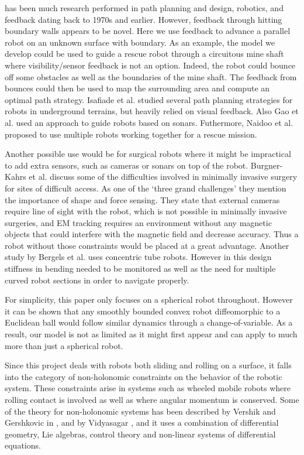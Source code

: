 \documentclass[journal]{IEEEtran}
\begin{document}
 has been much research performed in path planning and design, robotics, and feedback dating back to 1970s and earlier. However, feedback through hitting boundary walls appears to be novel. Here we use feedback to advance a parallel robot on an unknown surface with boundary. As an example, the model we develop could be used to guide a rescue robot through a circuitous mine shaft where visibility/sensor feedback is not an option. Indeed, the robot could bounce off some obstacles as well as the boundaries of the mine shaft. The feedback from bounces could then be used to map the surrounding area and compute an optimal path strategy. Isafiade et al. \cite{Isafiade13} studied several path planning strategies for robots in underground terrains, but heavily relied on visual feedback. Also Gao et al. \cite{Gao13} used an approach to guide robots based on sonars. Futhermore, Naidoo et al. \cite{Naidoo15} proposed to use multiple robots working together for a rescue mission.

Another possible use would be for surgical robots where it might be impractical to add extra sensors, such as cameras or sonars on top of the robot. Burgner-Kahrs et al. \cite{Burgner15} discuss some of the difficulties involved in minimally invasive surgery for sites of difficult access. As one of the `three grand challenges' they mention the importance of shape and force sensing. They state that external cameras require line of sight with the robot, which is not possible in minimally invasive surgeries, and EM tracking requires an environment without any magnetic objects that could interfere with the magnetic field and decrease accuracy. Thus a robot without those constraints would be placed at a great advantage. Another study by Bergels et al. \cite{Bergeles15} uses concentric tube robots. However in this design stiffness in bending needed to be monitored as well as the need for multiple curved robot sections in order to navigate properly.

For simplicity, this paper only focuses on a spherical robot throughout. However it can be shown that any smoothly bounded convex robot diffeomorphic to a Euclidean ball would follow similar dynamics through a change-of-variable. As a result, our model is not as limited as it might first appear and can apply to much more than just a spherical robot.  

Since this project deals with robots both sliding and rolling on a surface, it falls into the category of non-holonomic constraints on the behavior of the robotic system. These constraints arise in systems such as wheeled mobile robots where rolling contact is involved as well as where angular momentum is conserved. Some of the theory for non-holonomic systems has been described by Vershik and Gershkovic in \cite{Vershik88}, and by Vidyasagar \cite{Vidyasagar02}, and it uses a combination of differential geometry, Lie algebras, control theory and non-linear systems of differential equations. 
\end{document}
